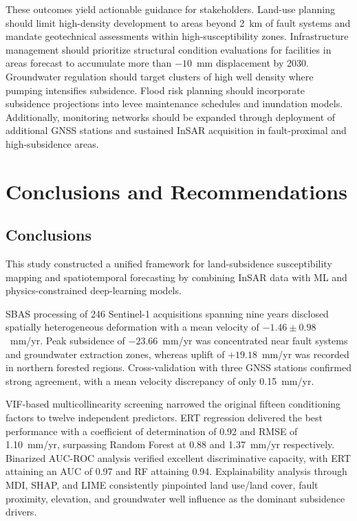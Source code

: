 \documentclass[oneside,doublespacing,flushright]{lsuthesis}
\begin{document}
These outcomes yield actionable guidance for stakeholders. Land-use planning should limit high-density development to areas beyond 2~km of fault systems and mandate geotechnical assessments within high-susceptibility zones. Infrastructure management should prioritize structural condition evaluations for facilities in areas forecast to accumulate more than $-10$~mm displacement by 2030. Groundwater regulation should target clusters of high well density where pumping intensifies subsidence. Flood risk planning should incorporate subsidence projections into levee maintenance schedules and inundation models. Additionally, monitoring networks should be expanded through deployment of additional GNSS stations and sustained InSAR acquisition in fault-proximal and high-subsidence areas.



\chapter{Conclusions and Recommendations}

\section{Conclusions}

This study constructed a unified framework for land-subsidence susceptibility mapping and spatiotemporal forecasting by combining InSAR data with ML and physics-constrained deep-learning models.

SBAS processing of 246 Sentinel-1 acquisitions spanning nine years disclosed spatially heterogeneous deformation with a mean velocity of $-1.46 \pm 0.98$~mm/yr. Peak subsidence of $-23.66$~mm/yr
was concentrated near fault systems and groundwater extraction zones, whereas uplift of $+19.18$~mm/yr was recorded in northern forested regions. Cross-validation with three GNSS stations confirmed 
strong agreement, with a mean velocity discrepancy of only 0.15~mm/yr.

VIF-based multicollinearity screening narrowed the original fifteen conditioning factors to twelve independent predictors. ERT regression delivered the best performance with a coefficient of determination of 0.92 and RMSE of 1.10~mm/yr, surpassing Random Forest at 0.88 and 1.37~mm/yr respectively. Binarized AUC-ROC analysis verified excellent discriminative capacity, with ERT attaining an AUC of 0.97 and RF attaining 0.94. Explainability analysis through MDI, SHAP, and LIME consistently pinpointed land use/land cover, fault proximity, elevation, and groundwater well influence as the dominant subsidence drivers.
\end{document}
